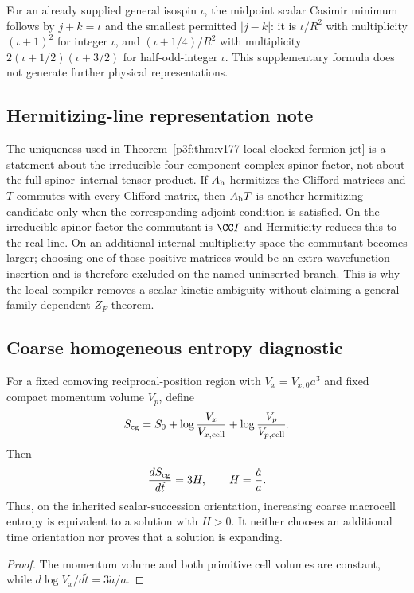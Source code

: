 \documentclass[11pt,a4paper]{article}
\begin{document}
For an already supplied general isospin $\iota$, the midpoint scalar
Casimir minimum follows by $j+k=\iota$ and the smallest permitted
$|j-k|$: it is $\iota/R^2$ with multiplicity $(\iota+1)^2$ for integer
$\iota$, and $(\iota+1/4)/R^2$ with multiplicity
$2(\iota+1/2)(\iota+3/2)$ for half-odd-integer $\iota$.
This supplementary formula does not generate further physical representations.

\subsection{Hermitizing-line representation note}
\label{p3f:app:v177-hermitizing-line}
The uniqueness used in
Theorem~\ref{p3f:thm:v177-local-clocked-fermion-jet} is a statement about the
irreducible four-component complex spinor factor, not about the full
spinor--internal tensor product.  If $A_{\rm h}$ hermitizes the Clifford
matrices and $T$ commutes with every Clifford matrix, then
$A_{\rm h}T$ is another hermitizing candidate only when the corresponding
adjoint condition is satisfied.  On the irreducible spinor factor the
commutant is $\CC I$ and Hermiticity reduces this to the real line.  On an
additional internal multiplicity space the commutant becomes larger; choosing
one of those positive matrices would be an extra wavefunction insertion and
is therefore excluded on the named uninserted branch.  This is why the local
compiler removes a scalar kinetic ambiguity without claiming a general
family-dependent $Z_F$ theorem.

\subsection{Coarse homogeneous entropy diagnostic}
\label{p3f:app:coarse-entropy}
\begin{corollary}
\label{p3:prop:thermodynamic-arrow}
For a fixed comoving reciprocal-position region with
\(V_x=V_{x,0}a^3\) and fixed compact momentum volume \(V_p\), define
\[
S_{\rm cg}=S_0+\log\frac{V_x}{V_{x,\rm cell}}
              +\log\frac{V_p}{V_{p,\rm cell}}.
\]
Then
\[
\frac{dS_{\rm cg}}{d\tilde t}=3H,
\qquad H=\frac{\dot a}{a}.
\]
Thus, on the inherited scalar-succession orientation, increasing coarse
macrocell entropy is equivalent to a solution with \(H>0\).  It neither
chooses an additional time orientation nor proves that a solution is
expanding.
\end{corollary}

\begin{proof}
The momentum volume and both primitive cell volumes are constant, while
\(d\log V_x/d\tilde t=3\dot a/a\).
\end{proof}
\end{document}
